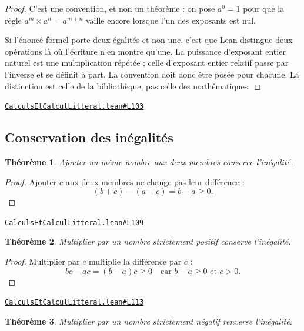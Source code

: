 \documentclass[11pt,a4paper]{article}
\theoremstyle{definition}
\theoremstyle{plain}
\newtheorem{theoreme}{Théorème}
\newcommand{\source}[2]{\par\smallskip\noindent\hfill{\footnotesize\href{#1}{\texttt{#2}}}\par\smallskip}
\begin{document}
\begin{proof}
C'est une convention, et non un théorème : on pose $a^0 = 1$ pour que la règle
$a^m \times a^n = a^{m+n}$ vaille encore lorsque l'un des exposants est nul.

Si l'énoncé formel porte deux égalités et non une, c'est que Lean distingue deux
opérations là où l'écriture n'en montre qu'une. La puissance d'exposant entier naturel est
une multiplication répétée ; celle d'exposant entier relatif passe par l'inverse et se
définit à part. La convention doit donc être posée pour chacune. La distinction est celle
de la bibliothèque, pas celle des mathématiques.
\end{proof}
\source{https://github.com/Commutator-IO/learn-lean/blob/main/courses/01-college/01-nombres-et-calculs/CalculsEtCalculLitteral.lean\#L103}{CalculsEtCalculLitteral.lean\#L103}

\subsection{Conservation des inégalités}

\begin{theoreme}
Ajouter un même nombre aux deux membres conserve l'inégalité.
\end{theoreme}

\begin{proof}
Ajouter $c$ aux deux membres ne change pas leur différence :
\[
(b + c) - (a + c) = b - a \ge 0 .
\]
\end{proof}
\source{https://github.com/Commutator-IO/learn-lean/blob/main/courses/01-college/01-nombres-et-calculs/CalculsEtCalculLitteral.lean\#L109}{CalculsEtCalculLitteral.lean\#L109}

\begin{theoreme}
Multiplier par un nombre strictement positif conserve l'inégalité.
\end{theoreme}

\begin{proof}
Multiplier par $c$ multiplie la différence par $c$ :
\[
bc - ac = (b - a)c \ge 0 \quad\text{car } b - a \ge 0 \text{ et } c > 0 .
\]
\end{proof}
\source{https://github.com/Commutator-IO/learn-lean/blob/main/courses/01-college/01-nombres-et-calculs/CalculsEtCalculLitteral.lean\#L113}{CalculsEtCalculLitteral.lean\#L113}

\begin{theoreme}
Multiplier par un nombre strictement négatif renverse l'inégalité.
\end{theoreme}
\end{document}
